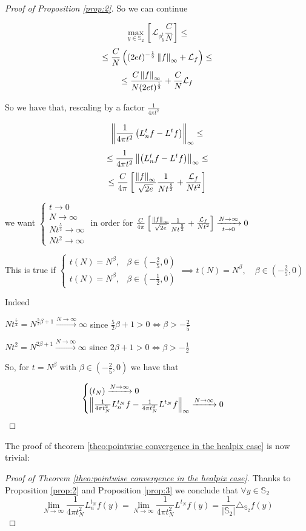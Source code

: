 \begin{proof}[Proof of Proposition \ref{prop:2}]
	So we can continue
	
	$$ \max _{y\in \mathbb S_2} \left[  \mathcal L_{\phi^t_y} \frac{C}{N} \right]\leq$$
	$$ \leq  \frac{C}{N} \left( (2et)^{-\frac{1}{2}} \left\lVert f\right\rVert_\infty + \mathcal L_f \right)\leq$$
	$$  \leq \frac{C\left\lVert f\right\rVert_\infty}{N(2et)^\frac{1}{2}} +   \frac{C}{N}\mathcal L_f$$
	
	So we have that, rescaling by a factor $\frac{1}{4\pi t^2}$
	
	$$\left\lVert\frac{1}{4\pi t^2}\left(L_n^tf-L^tf\right)\right\rVert_\infty\leq$$
	$$\leq \frac{1}{4\pi t^2}\left\lVert\left(L_n^tf-L^tf\right)\right\rVert_\infty \leq$$
	$$ \leq \frac{C}{4\pi}\left[\frac{\left\lVert f\right\rVert_\infty}{\sqrt{2e}}\frac{1}{Nt^\frac{5}{2}} + \frac{\mathcal L_f}{Nt^2}\right]$$
	
	we want $\begin{cases}
	t \rightarrow 0\\
	N \rightarrow \infty\\
	Nt^\frac{5}{2} \rightarrow \infty\\
	Nt^2 \rightarrow \infty
	\end{cases}$ in order for $ \frac{C}{4\pi}\left[\frac{\left\lVert f\right\rVert_\infty}{\sqrt{2e}}\frac{1}{Nt^\frac{5}{2}} + \frac{\mathcal L_f}{Nt^2}\right] \xrightarrow[t\to 0 ]{N\to\infty}0$
	
	This is true if $\begin{cases}
	t(N) = N^\beta, &\beta\in(-\frac{2}{5}, 0) \\
	t(N) = N^\beta, &\beta\in(-\frac{1}{2}, 0)
	\end{cases} \implies t(N) = N^\beta, \quad \beta\in(-\frac{2}{5}, 0)$
	
	Indeed 
	
	$Nt^\frac{5}{2}=N^{\frac{5}{2}\beta+1}\xrightarrow{N \to \infty} \infty$ since $\frac{5}{2}\beta+1>0 \iff \beta>-\frac{2}{5}$
	
	$Nt^2=N^{2\beta+1}\xrightarrow {N \to \infty} \infty$ since $2\beta+1>0 \iff \beta>-\frac{1}{2}$
	
	So, for $t=N^\beta$ with $\beta\in(-\frac{2}{5}, 0)$ we have that 
	
	$$\begin{cases}
	(t_N)\xrightarrow{N\to\infty}0\\
	\left\lVert\frac{1}{4\pi t_N^2}L_n^{t_N}f-\frac{1}{4\pi t_N^2}L^{t_N}f\right\rVert_\infty  \xrightarrow{N\to\infty}0
	\end{cases}$$
	
\end{proof}

The proof of theorem \ref{theo:pointwise convergence in the healpix case} is now trivial:
\begin{proof}[Proof of Theorem \ref{theo:pointwise convergence in the healpix case}]
	Thanks to Proposition \ref{prop:2} and Proposition \ref{prop:3}	we conclude that $\forall y\in\mathbb S_2 $
	$$\lim_{N\to\infty}\frac{1}{4\pi t_N^2} L_n^{t_N}f(y) =  \lim_{N\to\infty}\frac{1}{4\pi t_N^2} L^{t_N}f(y) = \frac{1}{|\mathbb S_2|}\triangle_{\mathbb S_2}f(y) $$
\end{proof}



